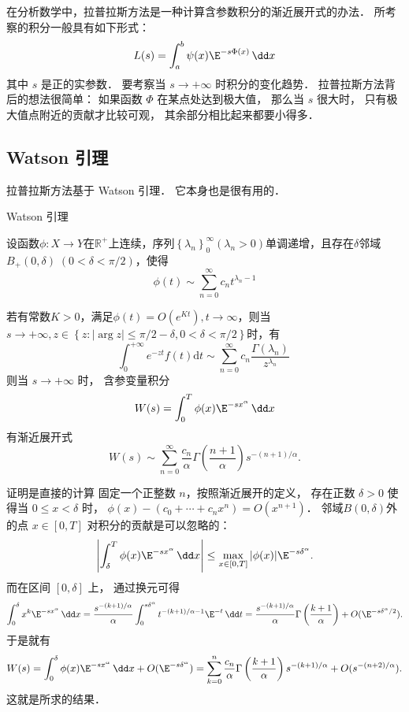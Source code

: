 

在分析数学中，拉普拉斯方法是一种计算含参数积分的渐近展开式的办法． 所考察的积分一般具有如下形式：
\begin{equation}\label{LapAsm_eq1}
L(s)=\int_a^b\psi(x)\E^{-s\Phi(x)}\,\dd x
\end{equation}
其中 $s$ 是正的实参数． 要考察当 $s\to+\infty$ 时积分的变化趋势． 拉普拉斯方法背后的想法很简单： 如果函数 $\Phi$ 在某点处达到极大值， 那么当 $s$ 很大时， 只有极大值点附近的贡献才比较可观， 其余部分相比起来都要小得多．

\subsection{Watson 引理}
拉普拉斯方法基于 Watson 引理． 它本身也是很有用的．

\begin{lemma}{Watson 引理}

设函数$\phi:X\to Y$在$\mathbb{R}^+$上连续，序列$\left\{\lambda_n\right\}_0^\infty\left(\lambda_n>0\right)$单调递增，且存在$\delta$邻域$B_{+}(0,\delta)\;(0<\delta<\pi/2)$，使得
\begin{equation}
  \phi\left(t\right)\sim\sum_{n=0}^{\infty}{c_nt^{\lambda_n-1}}
\end{equation}

若有常数$K>0$，满足$\phi\left(t\right)=O\left(e^{Kt}\right),t\to \infty$，则当$s\to+\infty,z\in{\left\{z:\left|\arg{z}\right|\le\pi/2-\delta,0<\delta<\pi/2\right\}}$时，有
\[
\int_{0}^{+\infty}{e^{-zt}f\left(t\right)}\mathrm{d}t∼\sum_{n=0}^{\infty}{c_n\frac{\Gamma\left(\lambda_n\right)}{z^{\lambda_n}}}\    
\]
则当 $s\to+\infty$ 时， 含参变量积分
\[
  W(s)=\int_0^T \phi(x)\E^{-s x^\alpha}\,\dd x
\]
有渐近展开式
\[
  W(s)\sim\sum_{n=0}^\infty \frac{c_n}{\alpha}\Gamma\left(\frac{n+1}{\alpha}\right)s^{-(n+1)/\alpha}.
\]
\end{lemma}

证明是直接的计算 固定一个正整数 $n$，按照渐近展开的定义， 存在正数 $\delta >0$ 使得当 $0\leq x<\delta$ 时， $\phi(x)-(c_0+\cdots+c_nx^n)=O(x^{n+1})$． 邻域$B(0,\delta)$外的点 $x\in[0,T]$ 对积分的贡献是可以忽略的：
\[
  \left|\int_\delta^T\phi(x)\E^{-sx^\alpha}\,\dd x\right|
\leq\max_{x\in[0,T]}|\phi(x)|\E^{-s\delta^\alpha}.
\]
而在区间 $[0,\delta]$ 上， 通过换元可得
\[
  \int_0^\delta x^k\E^{-sx^\alpha}\,\dd x
  =\frac{s^{-(k+1)/\alpha}}{\alpha}\int_0^{s\delta^\alpha}t^{-(k+1)/\alpha-1}\E^{-t}\,\dd t
  =\frac{s^{-(k+1)/\alpha}}{\alpha}\Gamma\left(\frac{k+1}{\alpha}\right)+O(\E^{-s\delta^\alpha/2}).
\]
于是就有
\[
  W(s)
  =\int_0^\delta\phi(x)\E^{-sx^\alpha}\,\dd x+O(\E^{-s\delta^\alpha})
  =\sum_{k=0}^n\frac{c_n}{\alpha}\Gamma\left(\frac{k+1}{\alpha}\right)s^{-(k+1)/\alpha}+O(s^{-(n+2)/\alpha}).
\]
这就是所求的结果．

